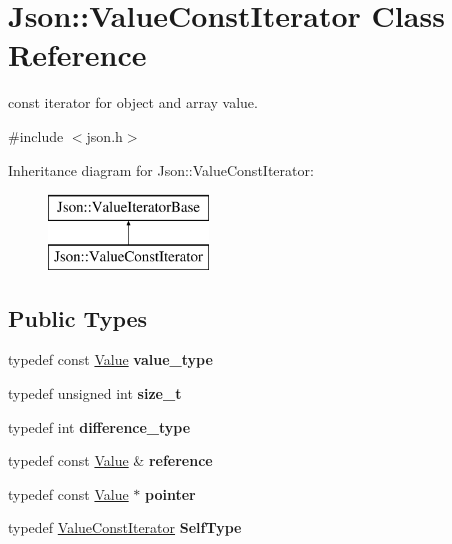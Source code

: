 \hypertarget{class_json_1_1_value_const_iterator}{}\section{Json\+::Value\+Const\+Iterator Class Reference}
\label{class_json_1_1_value_const_iterator}


const iterator for object and array value.  




{\ttfamily \#include $<$json.\+h$>$}

Inheritance diagram for Json\+::Value\+Const\+Iterator\+:\begin{figure}[H]
\begin{center}
\leavevmode
\includegraphics[height=2.000000cm]{class_json_1_1_value_const_iterator}
\end{center}
\end{figure}
\subsection*{Public Types}
\begin{DoxyCompactItemize}
\item 
\mbox{\label{class_json_1_1_value_const_iterator_aa5f1707dcef4bfe73e23ddc14dbe760d}} 
typedef const \mbox{\hyperlink{class_json_1_1_value}{Value}} {\bfseries value\+\_\+type}
\item 
\mbox{\label{class_json_1_1_value_const_iterator_a8685219d214dbd2b763357ae94fb0f27}} 
typedef unsigned int {\bfseries size\+\_\+t}
\item 
\mbox{\label{class_json_1_1_value_const_iterator_a32b36aa9d76e2b48ca74fb6e1979a95a}} 
typedef int {\bfseries difference\+\_\+type}
\item 
\mbox{\label{class_json_1_1_value_const_iterator_aa9b05c6a37cd352ea1ee6e13b816f709}} 
typedef const \mbox{\hyperlink{class_json_1_1_value}{Value}} \& {\bfseries reference}
\item 
\mbox{\label{class_json_1_1_value_const_iterator_a400136bd8bc09e9fddec0785fa2cff14}} 
typedef const \mbox{\hyperlink{class_json_1_1_value}{Value}} $\ast$ {\bfseries pointer}
\item 
\mbox{\label{class_json_1_1_value_const_iterator_a0c2e33e7eb5a80dd8709fb28ece83933}} 
typedef \mbox{\hyperlink{class_json_1_1_value_const_iterator}{Value\+Const\+Iterator}} {\bfseries Self\+Type}
\end{DoxyCompactItemize}
